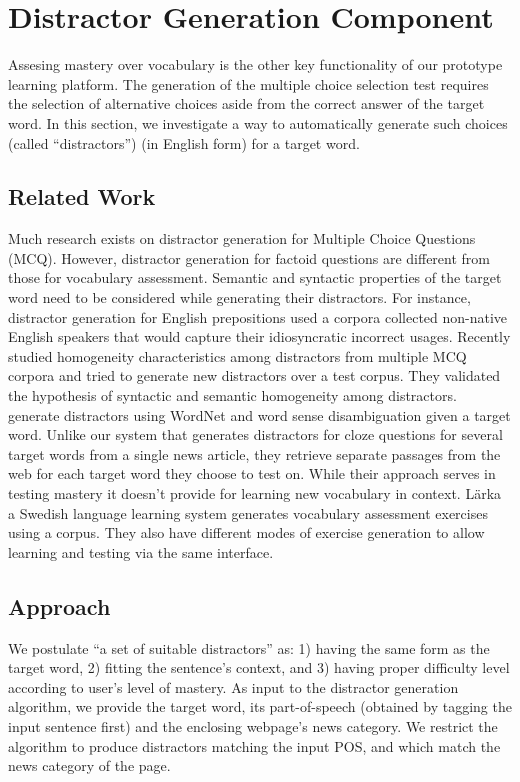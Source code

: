 \section{Distractor Generation Component}
\label{sec:distractor}

Assesing mastery over vocabulary is the other key functionality of our
prototype learning platform.  The generation of the multiple choice
selection test requires the selection of alternative choices aside
from the correct answer of the target word.  In this section, we
investigate a way to automatically generate such choices (called
``distractors'') (in English form) for a target word. 



\subsection{Related Work}
Much research exists on distractor generation for Multiple Choice Questions (MCQ).
However, distractor generation for factoid questions are different from those 
for vocabulary assessment. Semantic and syntactic properties of the target word 
need to be considered while generating their distractors. 
For instance, distractor generation for English prepositions \cite{lee2007} 
used a corpora collected non-native English speakers that would capture their
idiosyncratic incorrect usages. Recently \cite{pho2014multiple} studied homogeneity 
characteristics among distractors from multiple MCQ corpora and tried to generate 
new distractors over a test corpus. They validated the hypothesis of syntactic 
and semantic homogeneity among distractors. \cite{susanti2015} generate distractors 
using WordNet and word sense disambiguation given a target word. Unlike our system 
that generates distractors for cloze questions for several target words from a
single news article, they retrieve separate passages from the web for each 
target word they choose to test on. While their approach serves in testing 
mastery it doesn't provide for learning new vocabulary in context. 
L{\"a}rka \cite{volodina2014} a Swedish language learning system generates 
vocabulary assessment exercises using a corpus. They also have different modes of 
exercise generation to allow learning and testing via the same interface.


\subsection{Approach}
We postulate ``a
set of suitable distractors'' as: 1) having the same form as the
target word, 2) fitting the sentence's context, and 3) having proper
difficulty level according to user's level of mastery.
As input to the distractor generation algorithm, we provide the target
word, its part-of-speech (obtained by tagging the input sentence
first) and the enclosing webpage's news category. We restrict the
algorithm to produce distractors matching the input POS, and which
match the news category of the page.



